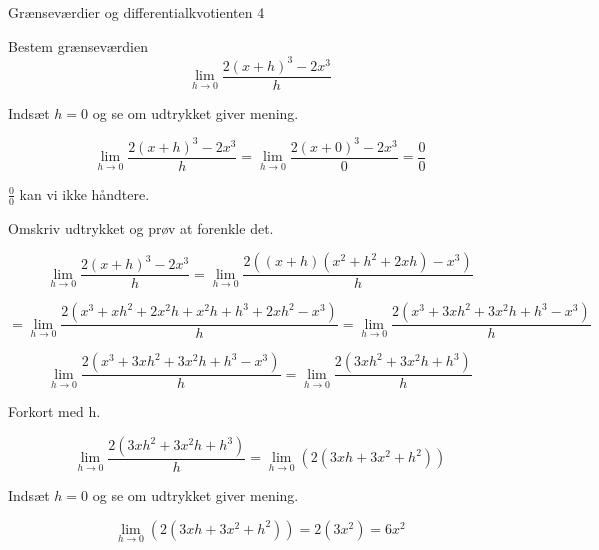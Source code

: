 \documentclass{article}
\begin{document}
\newpage
\begin{exercise}{Grænseværdier og differentialkvotienten 4}

Bestem grænseværdien
\[
\lim_{h \to 0} \frac{2(x + h)^3 - 2x^3}{h}
\]


\hint
Indsæt $h=0$ og se om udtrykket giver mening.

\hint
\[
\lim_{h \to 0} \frac{2(x + h)^3 - 2x^3}{h} = \lim_{h \to 0} \frac{2(x + 0)^3 - 2x^3}{0} = \frac{0}{0}
\]

\hint
$\frac{0}{0}$ kan vi ikke håndtere.

\hint
Omskriv udtrykket og prøv at forenkle det.

\hint
\[
\lim_{h \to 0} \frac{2(x + h)^3 - 2x^3}{h} = \lim_{h \to 0} \frac{2\left((x + h)(x^2 + h^2 + 2xh)-x^3\right)}{h}
\]

\hint
\[
= \lim_{h \to 0} \frac{2\left(x^3 + xh^2 + 2x^2h + x^2h + h^3 + 2xh^2 - x^3\right)}{h} = \lim_{h \to 0} \frac{2\left(x^3 + 3xh^2 + 3x^2h + h^3 - x^3\right)}{h}
\]


\hint
\[
\lim_{h \to 0} \frac{2\left(x^3 + 3xh^2 + 3x^2h + h^3 - x^3\right)}{h} = \lim_{h \to 0} \frac{2\left(3xh^2 + 3x^2h + h^3\right)}{h}
\]

\hint
Forkort med h.

\hint
\[
\lim_{h \to 0} \frac{2\left(3xh^2 + 3x^2h + h^3\right)}{h} = \lim_{h \to 0} \left(2\left(3xh + 3x^2 + h^2\right)\right)
\]

\hint
Indsæt $h=0$ og se om udtrykket giver mening.

\hint
\[
\lim_{h \to 0} \left(2\left(3xh + 3x^2 + h^2\right)\right) = 2(3x^2) = 6x^2
\]

\end{exercise}
\end{document}

